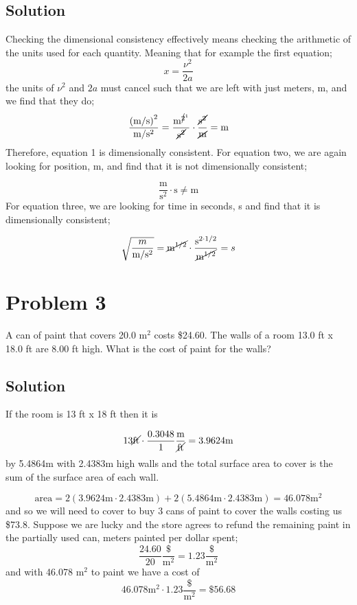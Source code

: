 \documentclass{article}
\newcommand{\meter}{\text{m}}
\newcommand{\second}{\text{s}}
\newcommand{\foot}{\text{ft}}
\begin{document}
\subsection*{Solution}
Checking the dimensional consistency effectively means checking the arithmetic of the units used for each quantity. Meaning that for example the first equation;
\[
	x = \frac{\nu^2}{2a}
\]
the units of $\nu^2$ and $2a$ must cancel such that we are left with just meters, $\meter$, and we find that they do;
\[
	\frac{\left( \meter/\second \right)^2}{\meter/\second^2} = \frac{\meter^{\cancel{2}^1}}{\cancel{\second^2}} \cdot \frac{\cancel{\second^2}}{\cancel{\meter}} = \meter
\]
Therefore, equation 1 is dimensionally consistent. For equation two, we are again looking for position, m, and find that it is not dimensionally consistent;

\[
	\frac{\meter}{\second^2} \cdot \second \ne \meter
\]
For equation three, we are looking for time in seconds, s and find that it is dimensionally consistent;

\[
	\sqrt{\frac{m}{\meter/\second^2}} = \cancel{\meter^{1/2}} \cdot \frac{\second^{2 \cdot 1/2}}{\cancel{\meter^{1/2}}} = s
\]

\section*{Problem 3}
A can of paint that covers 20.0 m$^2$ costs \$24.60. The walls of a room 13.0 ft x 18.0 ft are
8.00 ft high. What is the cost of paint for the walls?

\subsection*{Solution}
If the room is 13 ft x 18 ft then it is

\[
	13\cancel{\foot} \cdot \frac{0.3048}{1} \frac{\meter}{\cancel{\foot}} = 3.9624 \meter
\]
by 5.4864m with 2.4383m high walls and the total surface area to cover is the sum of the surface area of each wall.

\[
	\text{area} = 2\left( 3.9624 \meter \cdot 2.4383 \meter \right) + 2 \left( 5.4864 \meter \cdot 2.4383 \meter \right) = 46.078 \meter^2
\]
and so we will need to cover to buy 3 cans of paint to cover the walls costing us \$73.8. Suppose we are lucky and the store agrees to refund the remaining paint in the partially used can, meters painted per dollar spent;
\[
	\frac{24.60}{20} \frac{\$}{\meter^2} = 1.23 \frac{\$}{\meter^2}
\]
and with 46.078 m$^2$ to paint we have a cost of
\[
	46.078 \meter^2 \cdot 1.23 \frac{\$}{\meter^2} = \$56.68
\]
\end{document}
